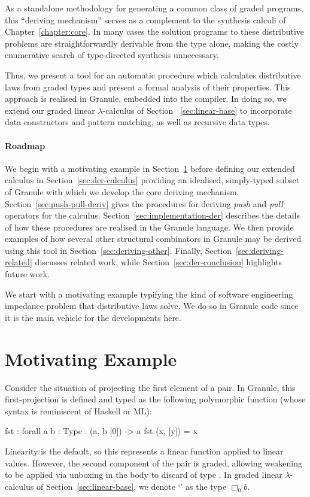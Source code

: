 As a standalone methodology for generating a common class of graded programs,
this ``deriving mechanism'' serves as a complement to the synthesis calculi of
Chapter~\ref{chapter:core}. In many cases the solution programs to these
distributive problems are straightforwardly derivable from the type alone,
making the costly enumerative search of type-directed synthesis unnecessary.

Thus, we present a tool for an automatic procedure which calculates distributive
laws from graded types and present a formal analysis of their properties. This
approach is realised in Granule, embedded into the compiler. In doing so, we 
extend our graded linear $\lambda$-calculus of Section
~\ref{sec:linear-base} to incorporate data constructors and pattern matching, as well 
as recursive data types. 

\paragraph{Roadmap} We begin with a motivating example in Section~\ref{sec:motivating-example}
before defining our extended calculus in Section~\ref{sec:der-calculus}
providing an idealised, simply-typed subset of Granule with which we develop the
core deriving mechanism. Section~\ref{sec:push-pull-deriv} gives the procedures
for deriving \emph{push} and \emph{pull} operators for the calculus.
Section~\ref{sec:implementation-der} describes the details of how these
procedures are realised in the Granule language. We then provide examples of how
several other structural combinators in Granule may be derived using this tool
in Section~\ref{sec:deriving-other}. Finally, Section~\ref{sec:deriving-related}
discusses related work, while Section~\ref{sec:der-conclusion} highlights future
work.

We start with a motivating example typifying the kind of software engineering
impedance problem that distributive laws solve. We do so in Granule code since
it is the main vehicle for the developments here.

\section{Motivating Example}
\label{sec:motivating-example}

Consider the situation of projecting the first element of a pair. In Granule,
this first-projection is defined and typed as the following polymorphic function
(whose syntax is reminiscent of Haskell or ML):
%
\begin{granule}
fst : forall { a b : Type } . (a, b [0]) -> a
fst (x, [y]) = x
\end{granule}
%
Linearity is the default, so this represents a linear function applied to linear
values. However, the second component of the pair is graded, allowing weakening
to be applied via unboxing in the body to discard  of type .
In graded linear $\lambda$-calculus of Section~\ref{sec:linear-base}, we denote `' as the
type $\Box_0 b$.

